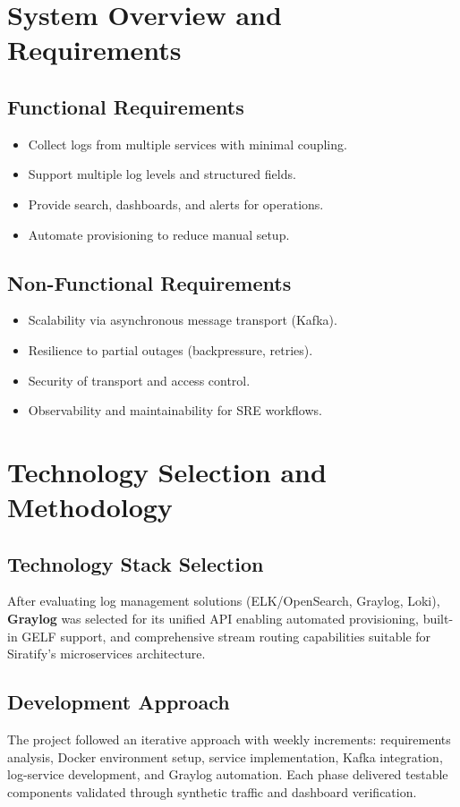 \documentclass[12pt,a4paper]{report}
\begin{document}
\chapter{System Overview and Requirements}
\section{Functional Requirements}
\begin{itemize}[leftmargin=1.2cm]
  \item Collect logs from multiple services with minimal coupling.
  \item Support multiple log levels and structured fields.
  \item Provide search, dashboards, and alerts for operations.
  \item Automate provisioning to reduce manual setup.
\end{itemize}

\section{Non-Functional Requirements}
\begin{itemize}[leftmargin=1.2cm]
  \item Scalability via asynchronous message transport (Kafka).
  \item Resilience to partial outages (backpressure, retries).
  \item Security of transport and access control.
  \item Observability and maintainability for SRE workflows.
\end{itemize}

\chapter{Technology Selection and Methodology}
\section{Technology Stack Selection}
After evaluating log management solutions (ELK/OpenSearch, Graylog, Loki), \textbf{Graylog} was selected for its unified API enabling automated provisioning, built-in GELF support, and comprehensive stream routing capabilities suitable for Siratify's microservices architecture.

\section{Development Approach}
The project followed an iterative approach with weekly increments: requirements analysis, Docker environment setup, service implementation, Kafka integration, log-service development, and Graylog automation. Each phase delivered testable components validated through synthetic traffic and dashboard verification.
\end{document}
